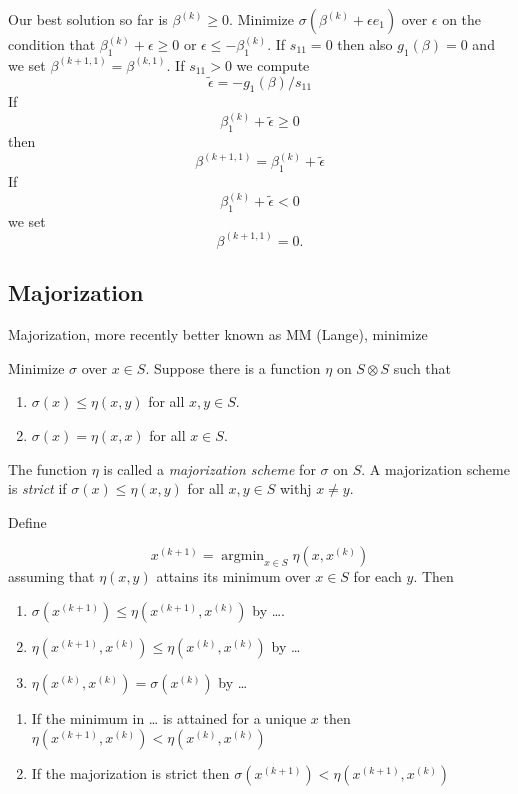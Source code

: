 \documentclass[
  12pt,
]{article}
\providecommand{\tightlist}{%
  \setlength{\itemsep}{0pt}\setlength{\parskip}{0pt}}
\begin{document}
Our best solution so far is
\(\beta^{(k)}\geq 0\). Minimize \(\sigma(\beta^{(k)}+\epsilon e_1)\) over \(\epsilon\)
on the condition that \(\beta^{(k)}_1+\epsilon\geq 0\) or \(\epsilon\leq-\beta^{(k)}_1\).
If \(s_{11}=0\) then also \(g_1(\beta)=0\) and we set \(\beta^{(k+1,1)}=\beta^{(k,1)}\).
If \(s_{11}>0\) we compute
\[
\tilde\epsilon=-g_1(\beta)/s_{11}
\]
If
\[
\beta^{(k)}_1+\tilde\epsilon\geq 0
\]
then
\[
\beta^{(k+1,1)}=\beta^{(k)}_1+\tilde\epsilon
\]
If
\[
\beta^{(k)}_1+\tilde\epsilon<0
\]
we set
\[
\beta^{(k+1,1)}=0.
\]

\subsection{Majorization}\label{majorization}

Majorization, more recently better known as MM (Lange), minimize

Minimize \(\sigma\) over \(x\in S\). Suppose there is a function
\(\eta\) on \(S\otimes S\) such that

\begin{enumerate}
\def\labelenumi{\arabic{enumi}.}
\tightlist
\item
  \(\sigma(x)\leq\eta(x,y)\) for all \(x,y\in S\).
\item
  \(\sigma(x)=\eta(x,x)\) for all \(x\in S\).
\end{enumerate}

The function \(\eta\) is called a \emph{majorization scheme} for \(\sigma\) on \(S\). A
majorization scheme is \emph{strict} if \(\sigma(x)\leq\eta(x,y)\) for all \(x,y\in S\)
withj \(x\not=y\).

Define

\[
x^{(k+1)}=\mathop{\text{argmin}}_{x\in S}\eta(x,x^{(k)})
\]
assuming that \(\eta(x,y)\) attains its minimum over \(x\in S\) for each \(y\). Then

\begin{enumerate}
\def\labelenumi{\arabic{enumi}.}
\tightlist
\item
  \(\sigma(x^{(k+1)})\leq\eta(x^{(k+1)},x^{(k)})\) by \ldots.
\item
  \(\eta(x^{(k+1)},x^{(k)})\leq\eta(x^{(k)},x^{(k)})\) by \ldots{}
\item
  \(\eta(x^{(k)},x^{(k)})=\sigma(x^{(k)})\) by \ldots{}
\end{enumerate}

\begin{enumerate}
\def\labelenumi{\alph{enumi}.}
\tightlist
\item
  If the minimum in \ldots{} is attained for a unique \(x\) then
  \(\eta(x^{(k+1)},x^{(k)})<\eta(x^{(k)},x^{(k)})\)
\item
  If the majorization is strict then
  \(\sigma(x^{(k+1)})<\eta(x^{(k+1)},x^{(k)})\)
\end{enumerate}
\end{document}
